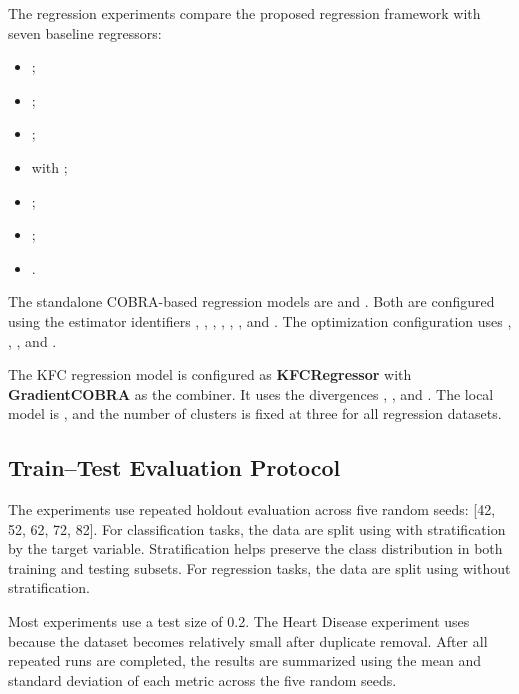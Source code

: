 The regression experiments compare the proposed regression framework with seven baseline regressors:

\begin{itemize}
    \item {};
    \item {};
    \item {};
    \item {} with ;
    \item {};
    \item {};
    \item {}.
\end{itemize}

The standalone COBRA-based regression models are  and . Both are configured using the estimator identifiers , , , , , , and . The optimization configuration uses , , , and .

The KFC regression model is configured as \textbf{KFCRegressor} with \textbf{GradientCOBRA} as the combiner. It uses the divergences , , and . The local model is , and the number of clusters is fixed at three for all regression datasets.

\subsection{Train--Test Evaluation Protocol}

\hs The experiments use repeated holdout evaluation across five random seeds: [42, 52, 62, 72, 82]. For classification tasks, the data are split using  with stratification by the target variable. Stratification helps preserve the class distribution in both training and testing subsets. For regression tasks, the data are split using  without stratification.

Most experiments use a test size of 0.2. The Heart Disease experiment uses  because the dataset becomes relatively small after duplicate removal. After all repeated runs are completed, the results are summarized using the mean and standard deviation of each metric across the five random seeds.


